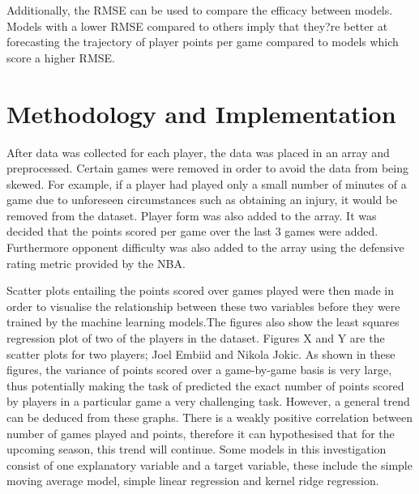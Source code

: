 \documentclass[a4paper,11pt,twoside]{article}
\begin{document}
Additionally, the RMSE can be used to compare the efficacy between models. Models with a lower RMSE compared to others imply that they?re better at forecasting the trajectory of player points per game compared to models which score a higher RMSE.



\newpage

\section{Methodology and Implementation}

After data was collected for each player, the data was placed in an array and preprocessed. Certain games were removed in order to avoid the data from being skewed. For example, if a player had played only a small number of minutes of a game due to unforeseen circumstances such as obtaining an injury, it would be removed from the dataset. Player form was also added to the array. It was decided that the points scored per game over the last 3 games were added. Furthermore opponent difficulty was also added to the array using the defensive rating metric provided by the NBA.

Scatter plots entailing the points scored over games played were then made in order to visualise the relationship between these two variables before they were trained by the machine learning models.The figures also show the least squares regression plot of two of the players in the dataset. Figures X and Y are the scatter plots for two players; Joel Embiid and Nikola Jokic. As shown in these figures, the variance of points scored over a game-by-game basis is very large, thus potentially making the task of predicted the exact number of points scored by players in a particular game a very challenging task. However, a general trend can be deduced from these graphs. There is a weakly positive correlation between number of games played and points, therefore it can hypothesised that for the upcoming season, this trend will continue. Some models in this investigation consist of one explanatory variable and a target variable, these include the simple moving average model, simple linear regression and kernel ridge regression.
\end{document}
